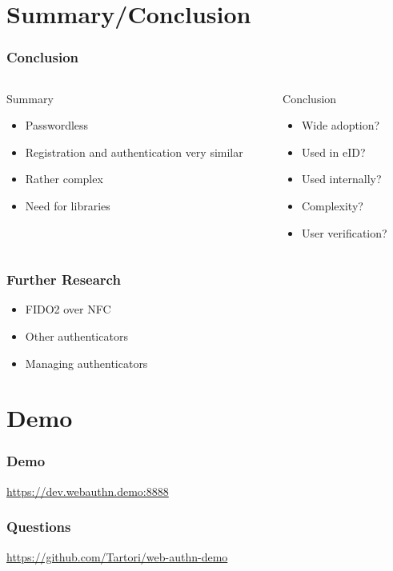 \documentclass{beamer}
\begin{document}
\section{Summary/Conclusion}

\begin{frame}[fragile]
  \frametitle{Conclusion}
  \begin{columns}
    \begin{column}{0.5\textwidth}
      Summary
      \begin{itemize}
          \item Passwordless
          \item Registration and authentication very similar
          \item Rather complex
          \item Need for libraries
      \end{itemize}
    \end{column}
    \pause
    \begin{column}{0.5\textwidth}
      Conclusion
      \begin{itemize}
        \item Wide adoption?
        \item Used in eID?
        \item Used internally?
        \item Complexity?
        \item User verification?
      \end{itemize}
    \end{column}
  \end{columns}
\end{frame}

\begin{frame}[fragile]
  \frametitle{Further Research}
    \begin{itemize}
      \item FIDO2 over NFC
      \item Other authenticators
      \item Managing authenticators
    \end{itemize}
\end{frame}

\section{Demo}%

\begin{frame}
  \frametitle{Demo}
  \url{https://dev.webauthn.demo:8888}
\end{frame}

\begin{frame}
  \frametitle{Questions}
  \pause
  \url{https://github.com/Tartori/web-authn-demo}
\end{frame}
\end{document}
